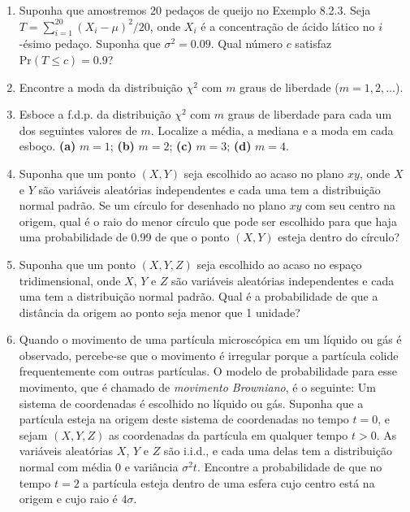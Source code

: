 \begin{enumerate}
    \item Suponha que amostremos 20 pedaços de queijo no Exemplo 8.2.3. Seja $T = \sum_{i=1}^{20}(X_i - \mu)^2 / 20$, onde $X_i$ é a concentração de ácido lático no $i$-ésimo pedaço. Suponha que $\sigma^2 = 0.09$. Qual número $c$ satisfaz $\text{Pr}(T \le c) = 0.9$?

    \item Encontre a moda da distribuição $\chi^2$ com $m$ graus de liberdade ($m=1, 2, \dots$).

    \item Esboce a f.d.p. da distribuição $\chi^2$ com $m$ graus de liberdade para cada um dos seguintes valores de $m$. Localize a média, a mediana e a moda em cada esboço. \textbf{(a)} $m=1$; \textbf{(b)} $m=2$; \textbf{(c)} $m=3$; \textbf{(d)} $m=4$.

    \item Suponha que um ponto $(X, Y)$ seja escolhido ao acaso no plano $xy$, onde $X$ e $Y$ são variáveis aleatórias independentes e cada uma tem a distribuição normal padrão. Se um círculo for desenhado no plano $xy$ com seu centro na origem, qual é o raio do menor círculo que pode ser escolhido para que haja uma probabilidade de 0.99 de que o ponto $(X, Y)$ esteja dentro do círculo?

    \item Suponha que um ponto $(X, Y, Z)$ seja escolhido ao acaso no espaço tridimensional, onde $X$, $Y$ e $Z$ são variáveis aleatórias independentes e cada uma tem a distribuição normal padrão. Qual é a probabilidade de que a distância da origem ao ponto seja menor que 1 unidade?

    \item Quando o movimento de uma partícula microscópica em um líquido ou gás é observado, percebe-se que o movimento é irregular porque a partícula colide frequentemente com outras partículas. O modelo de probabilidade para esse movimento, que é chamado de \textit{movimento Browniano}, é o seguinte: Um sistema de coordenadas é escolhido no líquido ou gás. Suponha que a partícula esteja na origem deste sistema de coordenadas no tempo $t=0$, e sejam $(X, Y, Z)$ as coordenadas da partícula em qualquer tempo $t > 0$. As variáveis aleatórias $X$, $Y$ e $Z$ são i.i.d., e cada uma delas tem a distribuição normal com média 0 e variância $\sigma^2 t$. Encontre a probabilidade de que no tempo $t=2$ a partícula esteja dentro de uma esfera cujo centro está na origem e cujo raio é $4\sigma$.


\end{enumerate}
